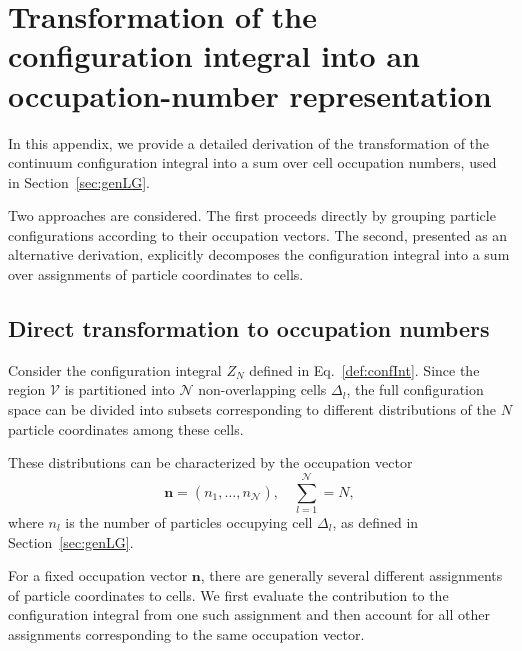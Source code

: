 \documentclass[12pt]{article}
\begin{document}
	\appendix
	
	\section{Transformation of the configuration integral into an occupation-number representation}
	\label{appendA}
	
	\setcounter{equation}{0}
	\renewcommand{\theequation}{\thesection.\arabic{equation}}
	
	In this appendix, we provide a detailed derivation of the transformation of the continuum configuration integral into a sum over cell occupation numbers, used in Section~\ref{sec:genLG}. 
	
	Two approaches are considered. The first proceeds directly by grouping particle configurations according to their occupation vectors. The second, presented as an alternative derivation, explicitly decomposes the configuration integral into a sum over assignments of particle coordinates to cells.
	
	\subsection{Direct transformation to occupation numbers}
	Consider the configuration integral $Z_N$ defined in Eq.~\eqref{def:confInt}. Since the region $\mathcal{V}$ is partitioned into $\mathcal{N}$ non-overlapping cells $\Delta_{l}$, the full configuration space can be divided into subsets corresponding to different distributions of the $N$ particle coordinates among these cells.
	
	These distributions can be characterized by the occupation vector
	\begin{equation}
		\mathbf{n} = (n_1, \ldots, n_{\mathcal{N}}), \quad \sum_{l=1}^{\mathcal{N}} = N,
	\end{equation}
	where $n_l$ is the number of particles occupying cell $\Delta_{l}$, as defined in Section~\ref{sec:genLG}.
	
	For a fixed occupation vector $\mathbf{n}$, there are generally several different assignments of particle coordinates to cells. We first evaluate the contribution to the configuration integral from one such assignment and then account for all other assignments corresponding to the same occupation vector.
	
\end{document}

